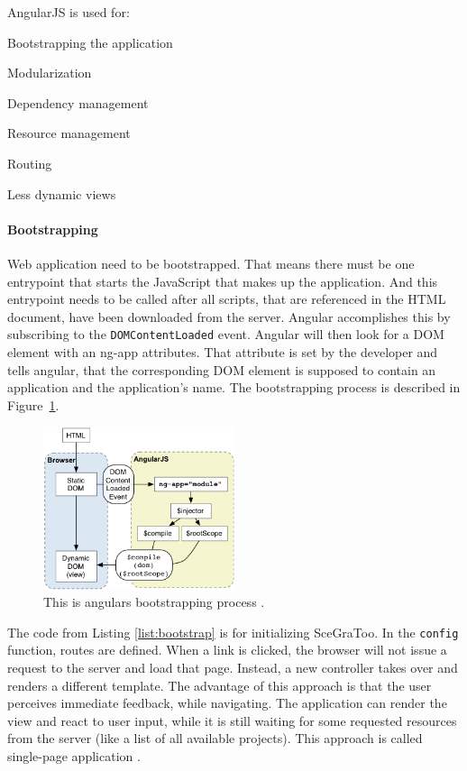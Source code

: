 AngularJS is used for:

\begin{itemize*}
  \item Bootstrapping the application
  \item Modularization
  \item Dependency management
  \item Resource management
  \item Routing
  \item Less dynamic views
\end{itemize*}

\paragraph{Bootstrapping}
\label{par:Bootstrapping and Routing}

Web application need to be bootstrapped. That means there must be one entrypoint
that starts the JavaScript that makes up the application. And this entrypoint
needs to be called after all scripts, that are referenced in the \gls{HTML}
document, have been downloaded from the server. Angular accomplishes this by
subscribing to the \texttt{DOMContentLoaded} event. Angular will then look for a
\gls{DOM} element with an ng-app attributes. That attribute is set by the
developer and tells angular, that the corresponding DOM element is supposed to
contain an application and the application's name. The bootstrapping process is
described in Figure~\ref{fig:angularbootstrap}.

\begin{figure}
  \centering
  \includegraphics[width=0.5\textwidth]{../assets/concepts-startup.png}
  \caption{This is angulars bootstrapping process \cite{angularbootstrap}.}
  \label{fig:angularbootstrap}
\end{figure}

The code from Listing \ref{list:bootstrap} is for initializing SceGraToo. In the \texttt{config}
function, routes are defined. When a link is clicked, the browser will not issue a
request to the server and load that page. Instead, a new controller takes over and
renders a different template. The advantage of this approach is that the user
perceives immediate feedback, while navigating. The application can render the view and
react to user input, while it is still waiting for some requested resources from
the server (like a list of all available projects). This approach is called
single-page application \cite{Mikowski:2013:SPW:2663433}.

